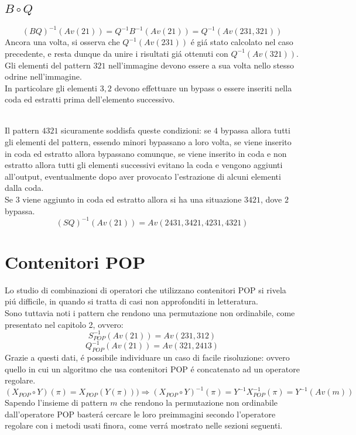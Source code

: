 \subsection*{$B\circ{Q}$}$$(BQ)^{-1}(Av(21))=Q^{-1}B^{-1}(Av(21))=Q^{-1}(Av(231,321))$$
Ancora una volta, si osserva che $Q^{-1}(Av(231))$ \'e gi\'a stato calcolato nel caso precedente, e resta dunque da unire i risultati gi\'a ottenuti con $Q^{-1}(Av(321))$.\\
Gli elementi del pattern $321$ nell'immagine devono essere a sua volta nello stesso odrine nell'immagine.\\
In particolare gli elementi $3,2$ devono effettuare un bypass o essere inseriti nella coda ed estratti prima dell'elemento successivo.\\\\
\begin{center}
\end{center}
Il pattern $4321$ sicuramente soddisfa queste condizioni: se $4$ bypassa allora tutti gli elementi del pattern, essendo minori bypassano a loro volta, se viene inserito in coda ed estratto allora bypassano comunque, se viene inserito in coda e non estratto allora tutti gli elementi successivi evitano la coda e vengono aggiunti all'output, eventualmente dopo aver provocato l'estrazione di alcuni elementi dalla coda.\\
Se $3$ viene aggiunto in coda ed estratto allora si ha una situazione $3421$, dove $2$ bypassa.\\
$$(SQ)^{-1}(Av(21))=Av(2431,3421,4231,4321)$$
\section*{Contenitori POP}
Lo studio di combinazioni di operatori che utilizzano contenitori POP si rivela pi\'u difficile, in quando si tratta di casi non approfonditi in letteratura.\\
Sono tuttavia noti i pattern che rendono una permutazione non ordinabile, come presentato nel capitolo 2, ovvero:
$$S_{POP}^{-1}(Av(21)) = Av(231,312)$$$$Q_{POP}^{-1}(Av(21))=Av(321,2413)$$
Grazie a questi dati, \'e possibile individuare un caso di facile risoluzione: ovvero quello in cui un algoritmo che usa contenitori POP \'e concatenato ad un operatore regolare.
$$(X_{POP}\circ{Y})(\pi)= X_{POP}(Y(\pi)))\Rightarrow(X_{POP}\circ{Y})^{-1}(\pi) = Y^{-1}X_{POP}^{-1}(\pi)=Y^{-1}(Av(m))$$
Sapendo l'insieme di pattern $m$ che rendono la permutazione non ordinabile dall'operatore POP baster\'a cercare le loro preimmagini secondo l'operatore regolare con i metodi usati finora, come verr\'a mostrato nelle sezioni seguenti.
